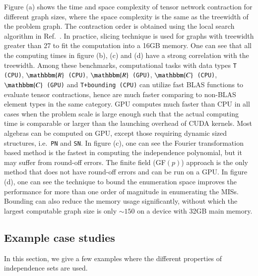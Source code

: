 \documentclass[onefignum, onetabnum]{siamart190516}
\newcommand{\<}{\langle}
\renewcommand{\>}{\rangle}
\newcommand{\Fig}[1]{Fig.~\ref{#1}}
\newcounter{example}
\begin{document}
Figure (a) shows the time and space complexity of tensor network contraction for different graph sizes, where the space complexity is the same as the treewidth of the problem graph.
The contraction order is obtained using the local search algorithm in Ref.~\cite{Kalachev2021}.
In practice, slicing technique is used for graphs with treewidth greater than 27 to fit the computation into a 16GB memory.
One can see that all the computing times in figure (b), (c) and (d) have a strong correlation with the treewidth.
Among these benchmarks, computational tasks with data types \texttt{T (CPU)},
\texttt{$\mathbbm{R}$ (CPU)}, \texttt{$\mathbbm{R}$ (GPU)}, \texttt{$\mathbbm{C}$ (CPU)}, \texttt{$\mathbbm{C}$ (GPU)} and \texttt{T+bounding (CPU)} can utilize fast BLAS functions to evaluate tensor contractions, hence 
are much faster comparing to non-BLAS element types in the same category.
GPU computes much faster than CPU in all cases when the problem scale is large enough such that the actual computing time is comparable or larger than the launching overhead of CUDA kernels.
Most algebras can be computed on GPU, except those requiring dynamic sized structures, i.e.\ \texttt{PN} and \texttt{SN}.
In figure (c), one can see the Fourier transformation based method is the fastest in computing the independence polynomial,
but it may suffer from round-off errors. The finite field (GF$(p)$) approach is the only method that does not have round-off errors and can be run on a GPU.
In figure (d), one can see the technique to bound the enumeration space improves the performance for more than one order of magnitude in enumerating the MISs.
Bounding can also reduce the memory usage significantly, without which the largest computable graph size is only $\sim150$ on a device with 32GB main memory.

\subsection{Example case studies} In this section, we give a few examples where the different properties of independence sets are used.
\end{document}
